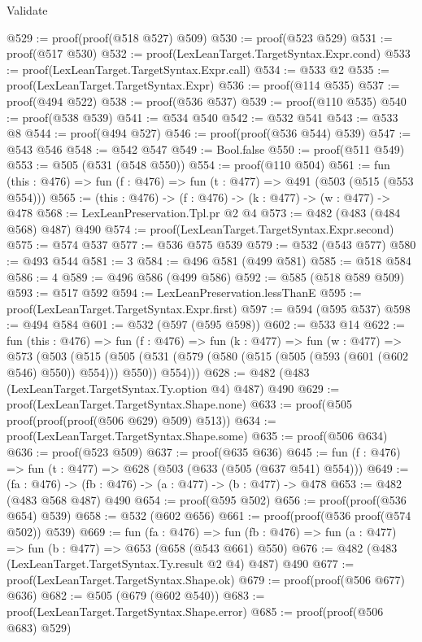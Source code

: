 \begin{lexlean}{Validate}
\begin{coremodule}
@529 := proof(proof(@518 @527) @509)
@530 := proof(@523 @529)
@531 := proof(@517 @530)
@532 := proof(LexLeanTarget.TargetSyntax.Expr.cond)
@533 := proof(LexLeanTarget.TargetSyntax.Expr.call)
@534 := @533 @2
@535 := proof(LexLeanTarget.TargetSyntax.Expr)
@536 := proof(@114 @535)
@537 := proof(@494 @522)
@538 := proof(@536 @537)
@539 := proof(@110 @535)
@540 := proof(@538 @539)
@541 := @534 @540
@542 := @532 @541
@543 := @533 @8
@544 := proof(@494 @527)
@546 := proof(proof(@536 @544) @539)
@547 := @543 @546
@548 := @542 @547
@549 := Bool.false
@550 := proof(@511 @549)
@553 := @505 (@531 (@548 @550))
@554 := proof(@110 @504)
@561 := fun (this : @476) => fun (f : @476) => fun (t : @477) => @491 (@503 (@515 (@553 @554)))
@565 := (this : @476) -> (f : @476) -> (k : @477) -> (w : @477) -> @478
@568 := LexLeanPreservation.Tpl.pr @2 @4
@573 := @482 (@483 (@484 @568) @487) @490
@574 := proof(LexLeanTarget.TargetSyntax.Expr.second)
@575 := @574 @537
@577 := @536 @575 @539
@579 := @532 (@543 @577)
@580 := @493 @544
@581 := 3
@584 := @496 @581 (@499 @581)
@585 := @518 @584
@586 := 4
@589 := @496 @586 (@499 @586)
@592 := @585 (@518 @589 @509)
@593 := @517 @592
@594 := LexLeanPreservation.lessThanE
@595 := proof(LexLeanTarget.TargetSyntax.Expr.first)
@597 := @594 (@595 @537)
@598 := @494 @584
@601 := @532 (@597 (@595 @598))
@602 := @533 @14
@622 := fun (this : @476) =>
  fun (f : @476) =>
  fun (k : @477) =>
  fun (w : @477) =>
  @573
    (@503
      (@515
        (@505 (@531 (@579 (@580 (@515 (@505 (@593 (@601 (@602 @546) @550)) @554))) @550)) @554)))
@628 := @482 (@483 (LexLeanTarget.TargetSyntax.Ty.option @4) @487) @490
@629 := proof(LexLeanTarget.TargetSyntax.Shape.none)
@633 := proof(@505 proof(proof(proof(@506 @629) @509) @513))
@634 := proof(LexLeanTarget.TargetSyntax.Shape.some)
@635 := proof(@506 @634)
@636 := proof(@523 @509)
@637 := proof(@635 @636)
@645 := fun (f : @476) => fun (t : @477) => @628 (@503 (@633 (@505 (@637 @541) @554)))
@649 := (fa : @476) -> (fb : @476) -> (a : @477) -> (b : @477) -> @478
@653 := @482 (@483 @568 @487) @490
@654 := proof(@595 @502)
@656 := proof(proof(@536 @654) @539)
@658 := @532 (@602 @656)
@661 := proof(proof(@536 proof(@574 @502)) @539)
@669 := fun (fa : @476) =>
  fun (fb : @476) => fun (a : @477) => fun (b : @477) => @653 (@658 (@543 @661) @550)
@676 := @482 (@483 (LexLeanTarget.TargetSyntax.Ty.result @2 @4) @487) @490
@677 := proof(LexLeanTarget.TargetSyntax.Shape.ok)
@679 := proof(proof(@506 @677) @636)
@682 := @505 (@679 (@602 @540))
@683 := proof(LexLeanTarget.TargetSyntax.Shape.error)
@685 := proof(proof(@506 @683) @529)

\end{coremodule}
\end{lexlean}
